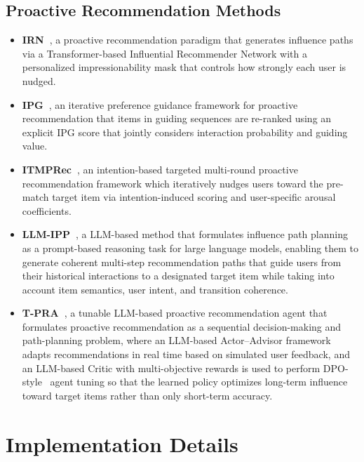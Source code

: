\subsection{Proactive Recommendation Methods}

\begin{itemize}
    \item \textbf{IRN~\cite{zhu2023influential}}, a proactive recommendation paradigm that generates influence paths via a Transformer-based Influential Recommender Network with a personalized impressionability mask that controls how strongly each user is nudged.
    \item \textbf{IPG~\cite{bi2024proactive}}, an iterative preference guidance framework for proactive recommendation that items in guiding sequences are re-ranked using an explicit IPG score that jointly considers interaction probability and guiding value.
    \item \textbf{ITMPRec~\cite{lian2025itmprec}}, an intention-based targeted multi-round proactive recommendation framework which iteratively nudges users toward the pre-match target item via intention-induced scoring and user-specific arousal coefficients.
    \item \textbf{LLM-IPP~\cite{wang2025leveraging}}, a LLM-based method that formulates influence path planning as a prompt-based reasoning task for large language models, enabling them to generate coherent multi-step recommendation paths that guide users from their historical interactions to a designated target item while taking into account item semantics, user intent, and transition coherence.
    \item \textbf{T-PRA~\cite{wang2025tunable}}, a tunable LLM-based proactive recommendation agent that formulates proactive recommendation as a sequential decision-making and path-planning problem, where an LLM-based Actor–Advisor framework~\cite{kahneman2011thinking} adapts recommendations in real time based on simulated user feedback, and an LLM-based Critic with multi-objective rewards is used to perform DPO-style~\cite{rafailov2023direct} agent tuning so that the learned policy optimizes long-term influence toward target items rather than only short-term accuracy.
\end{itemize}

\section{Implementation Details}
\label{app:implementation}


